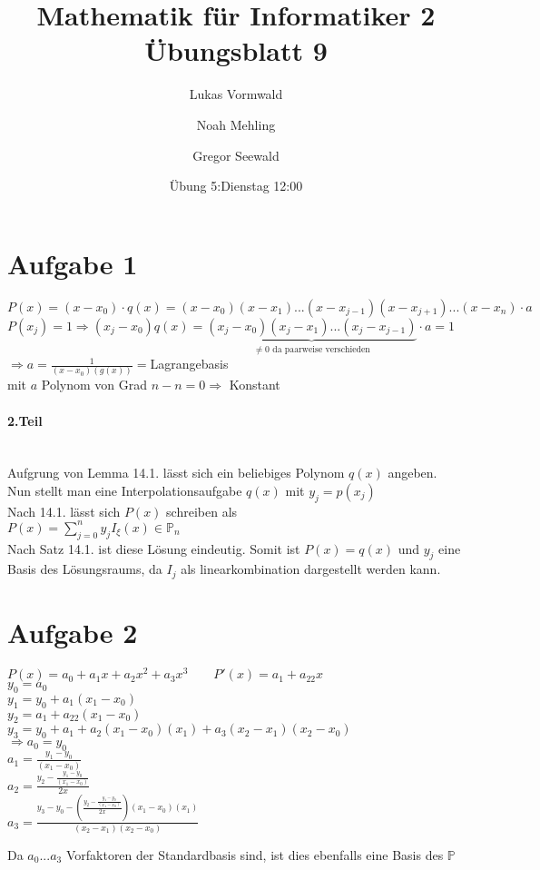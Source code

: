 \documentclass[11pt,a4paper]{article}
\title{Mathematik für Informatiker 2\\Übungsblatt 9}
\author{Lukas Vormwald \and Noah Mehling \and Gregor Seewald}
\date{Übung 5:Dienstag 12:00}
\newcommand{\Aufgabe}[1]{\section*{Aufgabe #1}}
\begin{document}
\maketitle

  \Aufgabe{1}
    $P(x)=(x-x_0)\cdot q(x)=(x-x_0)(x-x_1)...(x-x_{j-1})(x-x_{j+1})...(x-x_n)\cdot a$\\
    $P(x_j)=1\Rightarrow(x_j-x_0)q(x)=\underbrace{(x_j-x_0)(x_j-x_1)...(x_j-x_{j-1})}_{\neq 0 \text{ da paarweise verschieden}}\cdot a=1$\\
    $\Rightarrow a=\frac{1}{(x-x_0)(g(x))}=$Lagrangebasis\\
    mit $a$ Polynom von Grad $n-n=0\Rightarrow$ Konstant\\
    \paragraph{2.Teil}\\
    Aufgrung von Lemma 14.1. lässt sich ein beliebiges Polynom $q(x)$ angeben.\\
    Nun stellt man eine Interpolationsaufgabe $q(x)$ mit $y_j=p(x_j)$\\
    Nach 14.1. lässt sich $P(x)$ schreiben als\\
    $P(x)=\sum\limits_{j=0}^{n}y_jI_\xi(x)\in\mathbb{P}_n$\\
    Nach Satz 14.1. ist diese Lösung eindeutig. Somit ist $P(x)=q(x)$ und $y_j$ eine Basis des Lösungsraums, da $I_j$ als linearkombination dargestellt werden kann.

    \newpage

  \Aufgabe{2}
    $P(x)=a_0+a_1x+a_2x^2+a_3x^3\qquad P'(x)=a_1+a_22x$\\
    $y_0=a_0$\\
    $y_1=y_0+a_1(x_1-x_0)$\\
    $y_2=a_1+a_22(x_1-x_0)$\\
    $y_3=y_0+a_1+a_2(x_1-x_0)(x_1)+a_3(x_2-x_1)(x_2-x_0)$\\
    $\Rightarrow a_0=y_0$\\
    $a_1=\frac{y_1-y_0}{(x_1-x_0)}$\\
    $a_2=\frac{y_2-\frac{y_1-y_0}{(x_1-x_0)}}{2x}$\\
    $a_3=\frac{y_3-y_0-\left(\frac{y_2-\frac{y_1-y_0}{(x_1-x_0)}}{2x}\right)(x_1-x_0)(x_1)}{(x_2-x_1)(x_2-x_0)}$

    Da $a_0 ... a_3$ Vorfaktoren der Standardbasis sind, ist dies ebenfalls eine Basis des $\mathbb{P}$

    \newpage
\end{document}
